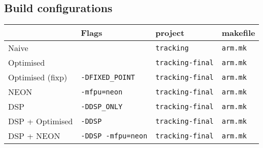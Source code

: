 \documentclass[final]{article} %
\begin{document}
\begin{appendices}
\section{Build configurations}
\begin{table}
	\centering
	\begin{tabular}{llll}
	\toprule
						& Flags						& project					& makefile			\\
	\midrule
	Naive				& \texttt{}					& \texttt{tracking}			& \texttt{arm.mk}	\\
	Optimised			& \texttt{}					& \texttt{tracking-final}	& \texttt{arm.mk}	\\
	Optimised (fixp)	& \texttt{-DFIXED\_POINT}	& \texttt{tracking-final}	& \texttt{arm.mk}	\\
	NEON				& \texttt{-mfpu=neon}		& \texttt{tracking-final}	& \texttt{arm.mk}	\\
	DSP					& \texttt{-DDSP\_ONLY}		& \texttt{tracking-final}	& \texttt{arm.mk}	\\
	DSP + Optimised		& \texttt{-DDSP}			& \texttt{tracking-final}	& \texttt{arm.mk}	\\
	DSP + NEON			& \texttt{-DDSP -mfpu=neon}	& \texttt{tracking-final}	& \texttt{arm.mk}	\\
	\bottomrule
	\end{tabular}
\end{table}


\end{appendices}
\end{document}
